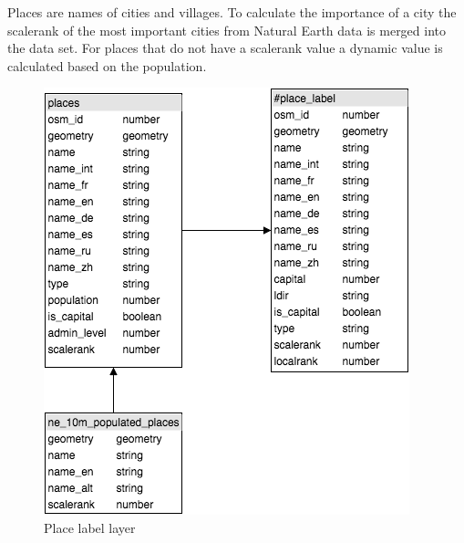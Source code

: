 Places are names of cities and villages. To calculate the importance of a city
the scalerank of the most important cities from Natural Earth data is merged into the
\osm{} data set. For places that do not have a scalerank value a dynamic value is calculated
based on the population.

\begin{figure}[H]
\centering
  \includegraphics[scale=0.6]{images/place_layer.png}
  \caption{Place label layer}
\end{figure}
